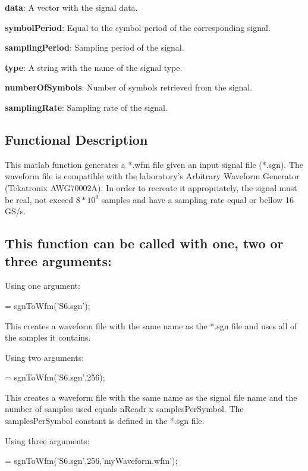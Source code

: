 \textbf{data}: A vector with the signal data.
\bigskip

\textbf{symbolPeriod}: Equal to the symbol period of the corresponding signal.
\bigskip

\textbf{samplingPeriod}: Sampling period of the signal.
\bigskip

\textbf{type}: A string with the name of the signal type.
\bigskip

\textbf{numberOfSymbols}: Number of symbols retrieved from the signal.
\bigskip

\textbf{samplingRate}: Sampling rate of the signal.


\subsection*{Functional Description}

This matlab function generates a *.wfm file given an input signal file (*.sgn). The waveform file is compatible with the laboratory's Arbitrary Waveform Generator (Tekatronix AWG70002A). In order to recreate it appropriately, the signal must be real, not exceed $8*10^9$ samples and have a sampling rate equal or bellow 16 GS/s.


\subsection*{This function can be called with one, two or three arguments:}
Using one argument:

\bigskip

 = sgnToWfm('S6.sgn');
\bigskip

\noindent
This creates a waveform file with the same name as the *.sgn file and uses all of the samples it contains.
\bigskip

\noindent
Using two arguments:

\bigskip

 = sgnToWfm('S6.sgn',256);
\bigskip

\noindent
This creates a waveform file with the same name as the signal file name and the number of samples used equals nReadr x samplesPerSymbol. The samplesPerSymbol constant is defined in the *.sgn file.
\bigskip

\noindent
Using three arguments:

\bigskip

 = sgnToWfm('S6.sgn',256,'myWaveform.wfm');
\bigskip

